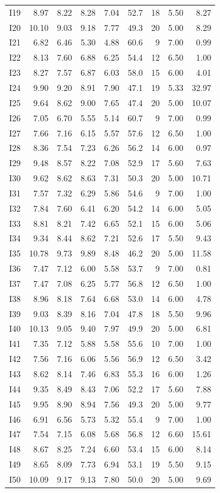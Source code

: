 \begin{longtable}{lrrrrrrrr}
I19 & 8.97 & 8.22 & 8.28 & 7.04 & 52.7 & 18 & 5.50 & 8.27 \\
I20 & 10.10 & 9.03 & 9.18 & 7.77 & 49.3 & 20 & 5.00 & 8.29 \\
I21 & 6.82 & 6.46 & 5.30 & 4.88 & 60.6 & 9 & 7.00 & 0.99 \\
I22 & 8.13 & 7.60 & 6.88 & 6.25 & 54.4 & 12 & 6.50 & 1.00 \\
I23 & 8.27 & 7.57 & 6.87 & 6.03 & 58.0 & 15 & 6.00 & 4.01 \\
I24 & 9.90 & 9.20 & 8.91 & 7.90 & 47.1 & 19 & 5.33 & 32.97 \\
I25 & 9.64 & 8.62 & 9.00 & 7.65 & 47.4 & 20 & 5.00 & 10.07 \\
I26 & 7.05 & 6.70 & 5.55 & 5.14 & 60.7 & 9 & 7.00 & 0.99 \\
I27 & 7.66 & 7.16 & 6.15 & 5.57 & 57.6 & 12 & 6.50 & 1.00 \\
I28 & 8.36 & 7.54 & 7.23 & 6.26 & 56.2 & 14 & 6.00 & 0.97 \\
I29 & 9.48 & 8.57 & 8.22 & 7.08 & 52.9 & 17 & 5.60 & 7.63 \\
I30 & 9.62 & 8.62 & 8.63 & 7.31 & 50.3 & 20 & 5.00 & 10.71 \\
I31 & 7.57 & 7.32 & 6.29 & 5.86 & 54.6 & 9 & 7.00 & 1.00 \\
I32 & 7.84 & 7.60 & 6.41 & 6.20 & 54.2 & 14 & 6.00 & 5.05 \\
I33 & 8.81 & 8.21 & 7.42 & 6.65 & 52.1 & 15 & 6.00 & 5.06 \\
I34 & 9.34 & 8.44 & 8.62 & 7.21 & 52.6 & 17 & 5.50 & 9.43 \\
I35 & 10.78 & 9.73 & 9.89 & 8.48 & 46.2 & 20 & 5.00 & 11.58 \\
I36 & 7.47 & 7.12 & 6.00 & 5.58 & 53.7 & 9 & 7.00 & 0.81 \\
I37 & 7.47 & 7.08 & 6.25 & 5.77 & 56.8 & 12 & 6.50 & 1.00 \\
I38 & 8.96 & 8.18 & 7.64 & 6.68 & 53.0 & 14 & 6.00 & 4.78 \\
I39 & 9.03 & 8.39 & 8.16 & 7.04 & 47.8 & 18 & 5.50 & 9.96 \\
I40 & 10.13 & 9.05 & 9.40 & 7.97 & 49.9 & 20 & 5.00 & 6.81 \\
I41 & 7.35 & 7.12 & 5.88 & 5.58 & 55.6 & 10 & 7.00 & 1.00 \\
I42 & 7.56 & 7.16 & 6.06 & 5.56 & 56.9 & 12 & 6.50 & 3.42 \\
I43 & 8.62 & 8.14 & 7.46 & 6.83 & 55.3 & 16 & 6.00 & 1.26 \\
I44 & 9.35 & 8.49 & 8.43 & 7.06 & 52.2 & 17 & 5.60 & 7.88 \\
I45 & 9.95 & 8.90 & 8.94 & 7.56 & 49.3 & 20 & 5.00 & 9.77 \\
I46 & 6.91 & 6.56 & 5.73 & 5.32 & 55.4 & 9 & 7.00 & 1.00 \\
I47 & 7.54 & 7.15 & 6.08 & 5.68 & 56.8 & 12 & 6.60 & 15.61 \\
I48 & 8.67 & 8.25 & 7.24 & 6.60 & 53.4 & 15 & 6.00 & 8.14 \\
I49 & 8.65 & 8.09 & 7.73 & 6.94 & 53.1 & 19 & 5.50 & 9.15 \\
I50 & 10.09 & 9.17 & 9.13 & 7.80 & 50.0 & 20 & 5.00 & 9.69 \\
\end{longtable}
\normalsize
\endgroup
